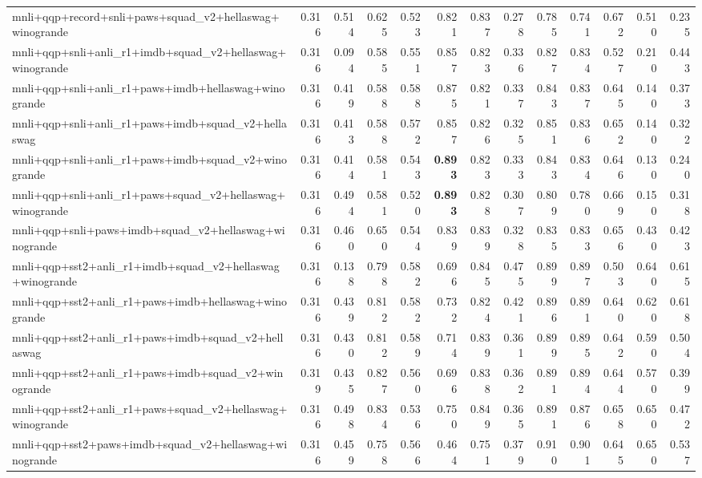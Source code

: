 \begin{table}[t]
\begin{tabular}{lrrrrrrrrrrrr}
    mnli+qqp+record+snli+paws+squad\_v2+hellaswag+winogrande & 0.316 & 0.514 & 0.625 & 0.523 & 0.821 & 0.837 & 0.278 & 0.785 & 0.741 & 0.672 & 0.510 & 0.235 \\
    mnli+qqp+snli+anli\_r1+imdb+squad\_v2+hellaswag+winogrande & 0.316 & 0.094 & 0.585 & 0.551 & 0.857 & 0.823 & 0.336 & 0.827 & 0.834 & 0.527 & 0.210 & 0.443 \\
    mnli+qqp+snli+anli\_r1+paws+imdb+hellaswag+winogrande & 0.316 & 0.419 & 0.588 & 0.588 & 0.875 & 0.821 & 0.337 & 0.843 & 0.837 & 0.645 & 0.140 & 0.373 \\
    mnli+qqp+snli+anli\_r1+paws+imdb+squad\_v2+hellaswag & 0.316 & 0.413 & 0.588 & 0.572 & 0.857 & 0.826 & 0.325 & 0.851 & 0.836 & 0.652 & 0.140 & 0.322 \\
    mnli+qqp+snli+anli\_r1+paws+imdb+squad\_v2+winogrande & 0.316 & 0.414 & 0.581 & 0.543 & \textbf{0.893} & 0.823 & 0.333 & 0.843 & 0.834 & 0.646 & 0.130 & 0.240 \\
    mnli+qqp+snli+anli\_r1+paws+squad\_v2+hellaswag+winogrande & 0.316 & 0.494 & 0.581 & 0.520 & \textbf{0.893} & 0.828 & 0.307 & 0.809 & 0.780 & 0.669 & 0.150 & 0.318 \\
    mnli+qqp+snli+paws+imdb+squad\_v2+hellaswag+winogrande & 0.316 & 0.460 & 0.650 & 0.544 & 0.839 & 0.839 & 0.328 & 0.835 & 0.833 & 0.656 & 0.430 & 0.423 \\
    mnli+qqp+sst2+anli\_r1+imdb+squad\_v2+hellaswag+winogrande & 0.316 & 0.138 & 0.798 & 0.582 & 0.696 & 0.845 & 0.475 & 0.899 & 0.897 & 0.503 & 0.640 & 0.615 \\
    mnli+qqp+sst2+anli\_r1+paws+imdb+hellaswag+winogrande & 0.316 & 0.439 & 0.812 & 0.582 & 0.732 & 0.824 & 0.421 & 0.896 & 0.891 & 0.640 & 0.620 & 0.618 \\
    mnli+qqp+sst2+anli\_r1+paws+imdb+squad\_v2+hellaswag & 0.316 & 0.430 & 0.812 & 0.589 & 0.714 & 0.839 & 0.361 & 0.899 & 0.895 & 0.642 & 0.590 & 0.504 \\
    mnli+qqp+sst2+anli\_r1+paws+imdb+squad\_v2+winogrande & 0.319 & 0.435 & 0.827 & 0.560 & 0.696 & 0.838 & 0.362 & 0.891 & 0.894 & 0.644 & 0.570 & 0.399 \\
    mnli+qqp+sst2+anli\_r1+paws+squad\_v2+hellaswag+winogrande & 0.316 & 0.498 & 0.834 & 0.536 & 0.750 & 0.849 & 0.365 & 0.891 & 0.876 & 0.658 & 0.650 & 0.472 \\
    mnli+qqp+sst2+paws+imdb+squad\_v2+hellaswag+winogrande & 0.316 & 0.459 & 0.758 & 0.566 & 0.464 & 0.751 & 0.379 & 0.910 & 0.901 & 0.645 & 0.650 & 0.537 \\

\end{tabular}
\end{table}
